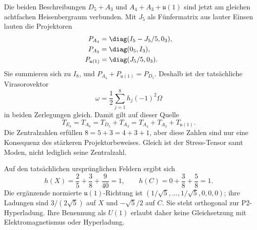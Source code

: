 Die beiden Beschreibungen $D_5+A_3$ und $A_4+A_3+\mathfrak u(1)$ sind jetzt am gleichen achtfachen Heisenbergraum verbunden. Mit $J_5$ als Fünfermatrix aus lauter Einsen lauten die Projektoren
\begin{align}
P_{A_4}&=\diag(I_5-J_5/5,0_3),\\
P_{A_3}&=\diag(0_5,I_3),\\
P_{\mathfrak u(1)}&=\diag(J_5/5,0_3).
\end{align}
Sie summieren sich zu $I_8$, und $P_{A_4}+P_{\mathfrak u(1)}=P_{D_5}$. Deshalb ist der tatsächliche Virasorovektor
\begin{equation}
\omega=\frac12\sum_{j=1}^8h_j(-1)^2\Omega
\end{equation}
in beiden Zerlegungen gleich. Damit gilt auf dieser Quelle
\begin{equation}
T_{E_8}=T_{A_8}=T_{D_5}+T_{A_3}
=T_{A_4}+T_{A_3}+T_{\mathfrak u(1)}.
\end{equation}
Die Zentralzahlen erfüllen $8=5+3=4+3+1$, aber diese Zahlen sind nur eine Konsequenz des stärkeren Projektorbeweises. Gleich ist der Stress-Tensor samt Moden, nicht lediglich seine Zentralzahl.

\begin{center}
\end{center}

Auf den tatsächlichen ursprünglichen Feldern ergibt sich
\begin{equation}
h(X)=\frac25+\frac38+\frac9{40}=1,
\qquad h(C)=0+\frac38+\frac58=1.
\end{equation}
Die ergänzende normierte $\mathfrak u(1)$-Richtung ist
$(1/\sqrt5,\ldots,1/\sqrt5,0,0,0)$; ihre Ladungen sind $3/(2\sqrt5)$ auf $X$ und $-\sqrt5/2$ auf $C$. Sie steht orthogonal zur P2-Hyperladung. Ihre Benennung als $U(1)$ erlaubt daher keine Gleichsetzung mit Elektromagnetismus oder Hyperladung.

